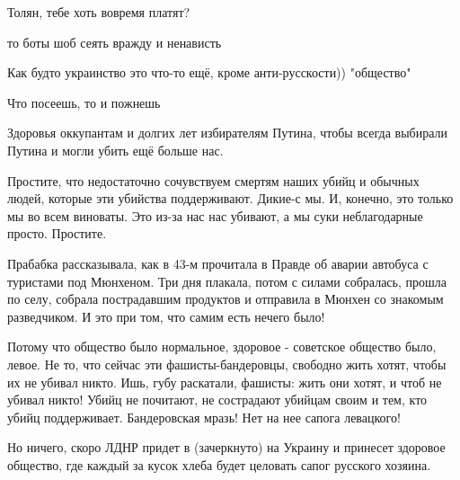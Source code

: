 \begin{itemize}
Толян, тебе хоть вовремя платят?

 
то боты шоб сеять вражду и ненависть

 
Как будто украинство это что-то ещё, кроме анти-русскости)) "общество" 🤣

 
Что посеешь, то и пожнешь


Здоровья оккупантам и долгих лет избирателям Путина, чтобы всегда выбирали
Путина и могли убить ещё больше нас.

Простите, что недостаточно сочувствуем смертям наших убийц и обычных людей,
которые эти убийства поддерживают. Дикие-с мы. И, конечно, это только мы во
всем виноваты. Это из-за нас нас убивают, а мы суки неблагодарные просто.
Простите.

Прабабка рассказывала, как в 43-м прочитала в Правде об аварии автобуса с
туристами под Мюнхеном. Три дня плакала, потом с силами собралась, прошла по
селу, собрала пострадавшим продуктов и отправила в Мюнхен со знакомым
разведчиком. И это при том, что самим есть нечего было!

Потому что общество было нормальное, здоровое - советское общество было, левое.
Не то, что сейчас эти фашисты-бандеровцы, свободно жить хотят, чтобы их не
убивал никто. Ишь, губу раскатали, фашисты: жить они хотят, и чтоб не убивал
никто! Убийц не почитают, не сострадают убийцам своим и тем, кто убийц
поддерживает. Бандеровская мразь! Нет на нее сапога левацкого!

Но ничего, скоро ЛДНР придет в (зачеркнуто) на Украину и принесет здоровое
общество, где каждый за кусок хлеба будет целовать сапог русского хозяина.


\end{itemize}
